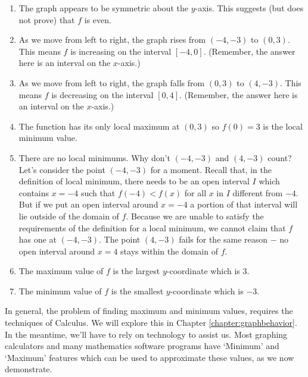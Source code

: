 {\begin{enumerate}


\item  The graph appears to be symmetric about the $y$-axis.  This suggests (but does not prove) that $f$ is even.

\item  As we move from left to right, the graph rises from $(-4,-3)$ to $(0,3)$.  This means $f$ is increasing on the interval $[-4,0]$.  (Remember, the answer here is an interval on the $x$-axis.)

\item  As we move from left to right, the graph falls from $(0,3)$ to $(4,-3)$.  This means $f$ is decreasing on the interval $[0,4]$.  (Remember, the answer here is an interval on the $x$-axis.)

\item  The function has its only local maximum at $(0,3)$ so $f(0) = 3$ is the local minimum value.

\item  There are no local minimums.  Why don't $(-4, -3)$ and $(4, -3)$ count?  Let's consider the point $(-4, -3)$ for a moment.  Recall that, in the definition of local minimum, there needs to be an open interval $I$ which contains $x = -4$ such that $f(-4) < f(x)$ for all $x$ in $I$ different from $-4$.  But if we put an open interval around $x= -4$ a portion of that interval will lie outside of the domain of $f$.  Because we are unable to satisfy the requirements of the definition for a local minimum, we cannot claim that $f$ has one at $(-4, -3)$.  The point $(4, -3)$ fails for the same reason $-$ no open interval around $x = 4$ stays within the domain of $f$.

\item  The maximum value of $f$ is the largest $y$-coordinate which is $3$.

\item  The minimum value of $f$ is the smallest $y$-coordinate which is $-3$.

\end{enumerate}
}

\smallskip

In general, the problem of finding maximum and minimum values, requires the techniques of Calculus. We will explore this in Chapter \ref{chapter:graphbehavior}. In the meantime, we'll have to rely on technology to assist us.  Most graphing calculators and many mathematics software programs have `Minimum' and `Maximum' features which can be used to approximate these values, as we now demonstrate.

